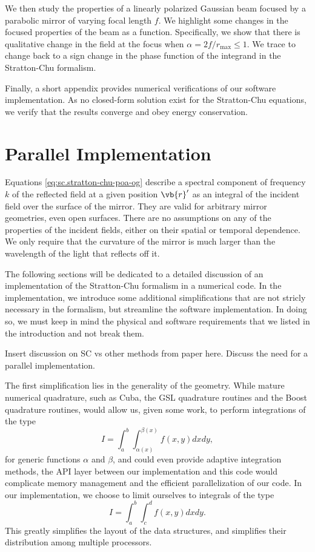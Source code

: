 \documentclass[11pt,SymmetricalJury]{inrsthesis/inrsthesis}
\begin{document}
We then study the properties of a linearly polarized Gaussian beam focused by a
parabolic mirror of varying focal length $f$. We highlight some changes in the
focused properties of the beam as a function. Specifically, we show that there
is qualitative change in the field at the focus when $\alpha=2f/r_\text{max}\leq
1$. We trace to change back to a sign change in the phase function of the
integrand in the Stratton-Chu formalism.

Finally, a short appendix provides numerical verifications of our software
implementation. As no closed-form solution exist for the Stratton-Chu equations,
we verify that the results converge and obey energy conservation.

\section{Parallel Implementation}

Equations \eqref{eq:sc.stratton-chu-poa-og} describe a spectral component of
frequency $k$ of the reflected field at a given position $\vb{r}'$ as an
integral of the incident field over the surface of the mirror. They are valid
for arbitrary mirror geometries, even open surfaces. There are no assumptions on
any of the properties of the incident fields, either on their spatial or
temporal dependence. We only require that the curvature of the mirror is much
larger than the wavelength of the light that reflects off it.

The following sections will be dedicated to a detailed discussion of an
implementation of the Stratton-Chu formalism in a numerical code. In the
implementation, we introduce some additional simplifications that are not
stricly necessary in the formalism, but streamline the software implementation.
In doing so, we must keep in mind the physical and software requirements that we
listed in the introduction and not break them.

{Insert discussion on SC vs other methods from paper here. Discuss the
need for a parallel implementation.}

The first simplification lies in the generality of the geometry. While mature
numerical quadrature, such as Cuba, the GSL quadrature routines and the Boost
quadrature routines, would allow us, given some work, to perform integrations of
the type
  \begin{equation}
    I=\int_a^b\int_{\alpha(x)}^{\beta(x)}f(x,y)dxdy,
  \end{equation}
for generic functions $\alpha$ and $\beta$, and could even provide adaptive
integration methods, the API layer between our implementation and this code
would complicate memory management and the efficient parallelization of our
code. In our implementation, we choose to limit ourselves to integrals of the
type
  \begin{equation}
    I=\int_a^b\int_c^d f(x,y)dxdy.
  \end{equation}
This greatly simplifies the layout of the data structures, and simplifies their
distribution among multiple processors.
\end{document}
